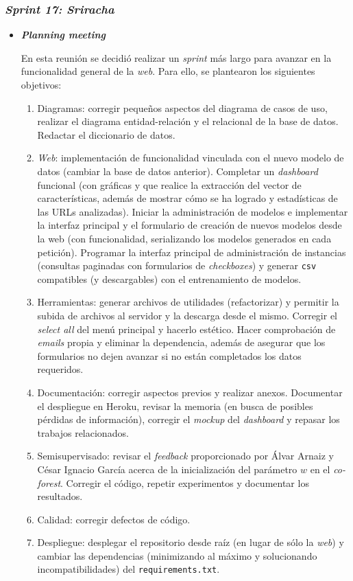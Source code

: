 \subsubsection{\textit{Sprint 17: Sriracha}}
\begin{itemize}
	
	\item \textbf{\textit{Planning meeting}}
	
	En esta reunión se decidió realizar un \textit{sprint} más largo para avanzar en la funcionalidad general de la \textit{web}. Para ello, se plantearon los siguientes objetivos:
	\begin{enumerate}
		\item Diagramas: corregir pequeños aspectos del diagrama de casos de uso, realizar el diagrama entidad-relación y el relacional de la base de datos. Redactar el diccionario de datos.
		\item \textit{Web}: implementación de funcionalidad vinculada con el nuevo modelo de datos (cambiar la base de datos anterior). Completar un \textit{dashboard} funcional (con gráficas y que realice la extracción del vector de características, además de mostrar cómo se ha logrado y estadísticas de las URLs analizadas). Iniciar la administración de modelos e implementar la interfaz principal y el formulario de creación de nuevos modelos desde la web (con funcionalidad, serializando los modelos generados en cada petición). Programar la interfaz principal de administración de instancias (consultas paginadas con formularios de \textit{checkboxes}) y generar \texttt{csv} compatibles (y descargables) con el entrenamiento de modelos.
		\item Herramientas: generar archivos de utilidades (refactorizar) y permitir la subida de archivos al servidor y la descarga desde el mismo. Corregir el \textit{select all} del menú principal y hacerlo estético. Hacer comprobación de \textit{emails} propia y eliminar la dependencia, además de asegurar que los formularios no dejen avanzar si no están completados los datos requeridos.
		\item Documentación: corregir aspectos previos y realizar anexos. Documentar el despliegue en Heroku, revisar la memoria (en busca de posibles pérdidas de información), corregir el \textit{mockup} del \textit{dashboard} y repasar los trabajos relacionados.
		\item Semisupervisado: revisar el \textit{feedback} proporcionado por Álvar Arnaiz y César Ignacio García acerca de la inicialización del parámetro $w$ en el \textit{co-forest}. Corregir el código, repetir experimentos y documentar los resultados.
		\item Calidad: corregir defectos de código.
		\item Despliegue: desplegar el repositorio desde raíz (en lugar de sólo la \textit{web}) y cambiar las dependencias (minimizando al máximo y solucionando incompatibilidades) del \texttt{requirements.txt}.
		

\end{enumerate}
\end{itemize}
